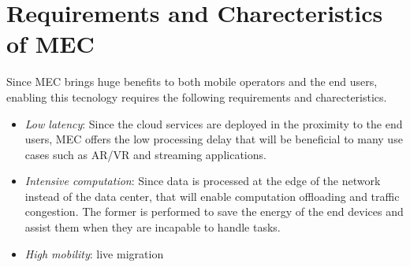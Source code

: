 \section{Requirements and Charecteristics of MEC}  \label{requirements}

Since MEC brings huge benefits to both mobile operators and the end users, enabling this tecnology requires the following requirements and charecteristics.

\begin{itemize}

\item \textit{\textit{Low latency}}: Since the cloud services are deployed in the proximity to the end users, MEC offers the low processing delay that will be beneficial to many use cases such as AR/VR and streaming applications.

\item \textit{\textit{Intensive computation}}: Since data is processed at the edge of the network instead of the data center, that will enable computation offloading and traffic congestion. The former is performed to save the energy of the end devices and assist them when they are incapable to handle tasks.

\item \textit{\textit{High mobility}}: live migration

\end{itemize}
